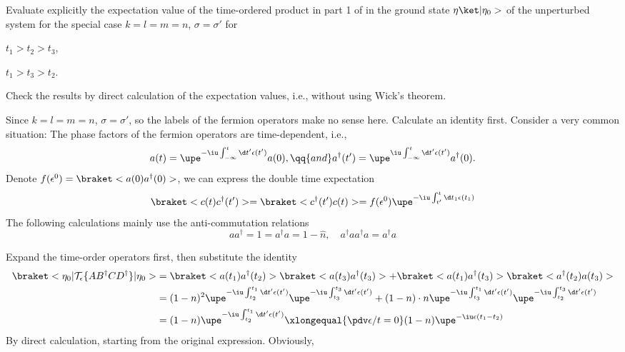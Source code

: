 \begin{problem}
  Evaluate explicitly the expectation value of the time-ordered product in
  part 1 of  in the ground state $\eta\ket|\eta_0>$ of the
  unperturbed system for the special case $k = l = m = n$, $\sigma = \sigma'$
  for
  \begin{enumext}[columns = 2]
    \item $t_1 > t_2 > t_3$,
    \item $t_1 > t_3 > t_2$.
  \end{enumext}
  Check the results by direct calculation of the expectation values, i.e.,
  without using Wick's theorem.
\end{problem}
\begin{solution}
  Since $k = l = m = n$, $\sigma = \sigma'$, so the labels of the fermion
  operators make no sense here. Calculate an identity first. Consider a very
  common situation: The phase factors of the fermion operators are
  time-dependent, i.e.,
  \[
    a(t) = \upe^{-\iu\int_{-\infty}^t \d t'\epsilon(t')} a(0), \qq{and}
    a^\dagger(t') = \upe^{\iu\int_{-\infty}^t \d t'\epsilon(t')} a^\dagger(0).
  \]
  Denote $f(\epsilon^0) = \braket<a(0) a^\dagger(0)>$,
  we can express the double time expectation
  \[
    \braket<c(t) c^\dagger(t')> = \braket<c^\dagger(t') c(t)>
  = f(\epsilon^0)\upe^{-\iu\int_{t'}^t \d t_1 \epsilon(t_1)}
  \]
  The following calculations mainly use the anti-commutation relations
  \[
    aa^\dagger = 1 = a^\dagger a = 1 - \hat n, \quad
    a^\dagger aa^\dagger a = a^\dagger a
  \]
  \begin{enumext}
    \item Expand the time-order operators first, then substitute the identity
    \begin{align*}
      \braket<\eta_0|\mathcal T_\epsilon\{AB^\dagger CD^\dagger\}|\eta_0>
  & = \braket<a(t_1) a^\dagger(t_2)>
      \braket<a(t_3) a^\dagger(t_3)>
    + \braket<a(t_1) a^\dagger(t_3)>
     \braket<a^\dagger(t_2) a(t_3)>\\
  & = (1 - n)^2
      \upe^{-\iu\int_{t_2}^{t_1} \d t'\epsilon(t')}
      \upe^{-\iu\int_{t_3}^{t_3} \d t'\epsilon(t')}
    + (1 - n) \cdot n
      \upe^{-\iu\int_{t_3}^{t_1} \d t'\epsilon(t')}
      \upe^{-\iu\int_{t_2}^{t_3} \d t'\epsilon(t')}\\
  & = (1 - n) \upe^{-\iu\int_{t_2}^{t_1} \d t'\epsilon(t')}
      \xlongequal{\pdv\epsilon/t = 0} (1 - n)
      \upe^{-\iu\epsilon(t_1 - t_2)}
    \end{align*}
    By direct calculation, starting from the original expression. Obviously,

\end{enumext}
\end{solution}
